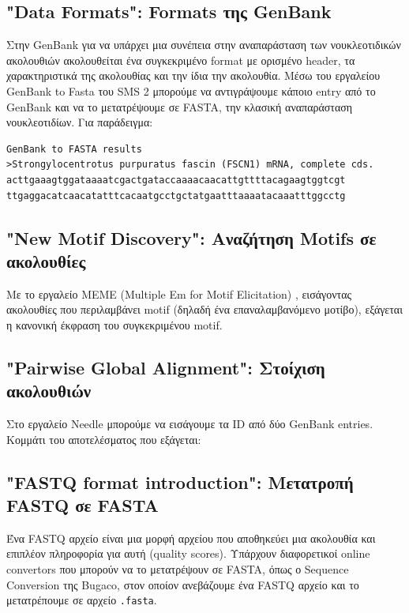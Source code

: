     \subsection{"Data Formats": Formats της GenBank}
        Στην GenBank για να υπάρχει μια συνέπεια στην αναπαράσταση των νουκλεοτιδικών ακολουθιών ακολουθείται ένα συγκεκριμένο format με ορισμένο header, τα χαρακτηριστικά της ακολουθίας και την ίδια την ακολουθία.
        Μέσω του εργαλείου GenBank to Fasta του SMS 2 \cite{GenBankToFASTA} μπορούμε να αντιγράψουμε κάποιο entry από το GenBank και να το μετατρέψουμε σε FASTA, την κλασική αναπαράσταση νουκλεοτιδίων.
        Για παράδειγμα:

\begin{graycomment} \footnotesize
    \begin{verbatim}
GenBank to FASTA results
>Strongylocentrotus purpuratus fascin (FSCN1) mRNA, complete cds.
acttgaaagtggataaaatcgactgataccaaaacaacattgttttacagaagtggtcgt
ttgaggacatcaacatatttcacaatgcctgctatgaatttaaaatacaaatttggcctg\end{verbatim}
\end{graycomment}

    \subsection{"New Motif Discovery": Αναζήτηση Motifs σε ακολουθίες}
        Με το εργαλείο MEME (Multiple Em for Motif Elicitation) \cite{MEME}, εισάγοντας ακολουθίες που περιλαμβάνει motif (δηλαδή ένα επαναλαμβανόμενο μοτίβο), εξάγεται η κανονική έκφραση του συγκεκριμένου motif.

    \subsection{"Pairwise Global Alignment": Στοίχιση ακολουθιών}
        Στο εργαλείο Needle \cite{Needle} μπορούμε να εισάγουμε τα ID από δύο GenBank entries. Κομμάτι του αποτελέσματος που εξάγεται:
\begin{graycomment} \footnotesize
            \begin{verbatim}
%# Length: 142
%# Identity:     122/142 (85.9%)
%# Similarity:   131/142 (92.3%)
%# Gaps:           0/142 ( 0.0%)
%# Score: 648.0 \end{verbatim}
\end{graycomment}


    \subsection{"FASTQ format introduction": Μετατροπή FASTQ σε FASTA}
        Ένα FASTQ αρχείο είναι μια μορφή αρχείου που αποθηκεύει μια ακολουθία και επιπλέον πληροφορία για αυτή (quality scores).
        Υπάρχουν διαφορετικοί online convertors που μπορούν να το μετατρέψουν σε FASTA, όπως ο Sequence Conversion της Bugaco, \cite{BugacoConversion} στον οποίον ανεβάζουμε ένα FASTQ αρχείο και το μετατρέπουμε σε αρχείο \texttt{.fasta}.

